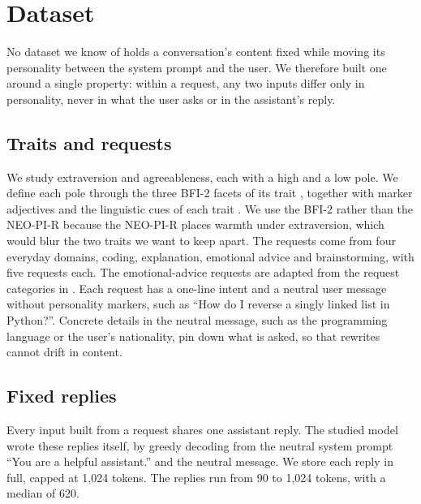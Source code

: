 \section{Dataset}
\label{sec:dataset}

No dataset we know of holds a conversation's content fixed while moving its personality between the system prompt and the user. We therefore built one around a single property: within a request, any two inputs differ only in personality, never in what the user asks or in the assistant's reply.

\subsection{Traits and requests}
We study extraversion and agreeableness, each with a high and a low pole. We define each pole through the three BFI-2 facets of its trait \citep{soto2017next}, together with marker adjectives \citep{saucier1994mini} and the linguistic cues of each trait \citep{pennebaker1999linguistic, mairesse2007using}. We use the BFI-2 rather than the NEO-PI-R because the NEO-PI-R places warmth under extraversion, which would blur the two traits we want to keep apart. The requests come from four everyday domains, coding, explanation, emotional advice and brainstorming, with five requests each. The emotional-advice requests are adapted from the request categories in \citet{li2025human}. Each request has a one-line intent and a neutral user message without personality markers, such as ``How do I reverse a singly linked list in Python?''. Concrete details in the neutral message, such as the programming language or the user's nationality, pin down what is asked, so that rewrites cannot drift in content.

\subsection{Fixed replies}
Every input built from a request shares one assistant reply. The studied model wrote these replies itself, by greedy decoding from the neutral system prompt ``You are a helpful assistant.'' and the neutral message. We store each reply in full, capped at 1,024 tokens. The replies run from 90 to 1,024 tokens, with a median of 620.

